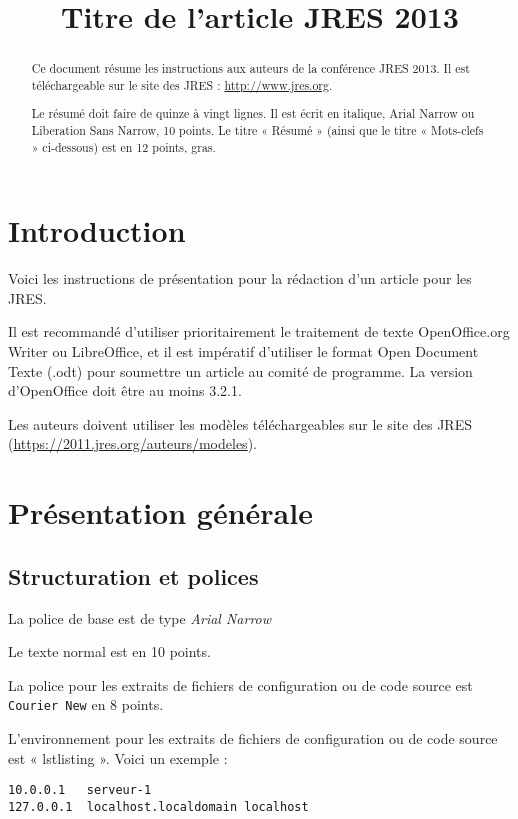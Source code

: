 \documentclass[11pt]{jres}
\title{Titre de l'article JRES 2013}
\date{}
\begin{document}
\maketitle

\begin{abstract}
Ce document résume les instructions aux auteurs de la conférence JRES 2013.
Il est téléchargeable sur le site des JRES : \url{http://www.jres.org}.

Le résumé doit faire de quinze à vingt lignes. Il est écrit en italique, 
Arial Narrow ou Liberation Sans Narrow, 10 points. 
Le titre « Résumé » (ainsi que le titre « Mots-clefs » ci-dessous) 
est en 12 points, gras.
\end{abstract}


\section{Introduction}

Voici les instructions de présentation pour la rédaction d'un article
pour les JRES.  

Il est recommandé d'utiliser prioritairement le
traitement de texte OpenOffice.org Writer ou LibreOffice, et il est
impératif d'utiliser le format Open Document Texte (.odt) pour
soumettre un article au comité de programme. 
La version d'OpenOffice doit être au moins 3.2.1.  

Les auteurs doivent utiliser les modèles téléchargeables sur le site
des JRES (\url{https://2011.jres.org/auteurs/modeles}).

\section{Présentation générale}

\subsection{Structuration et polices}

La police de base est de type \emph{Arial Narrow}

Le texte  normal est en 10 points.

La police pour les extraits de fichiers de configuration ou de code source est \texttt{Courier New} en 8 points.

L'environnement pour les extraits de fichiers de configuration ou 
de code source  est « lstlisting ». Voici un exemple :

\begin{lstlisting}
10.0.0.1   serveur-1
127.0.0.1  localhost.localdomain localhost
\end{lstlisting}
\end{document}
